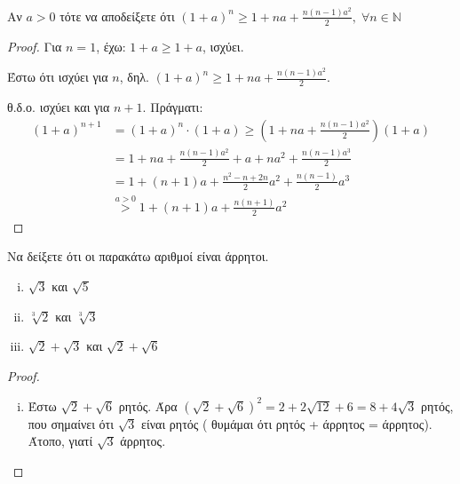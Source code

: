 \begin{multicols}{2}
\begin{enumerate}
    \item \textcolor{Col1}{Αν $a > 0$ τότε να αποδείξετε ότι $ (1+a)^{n} 
            \geq 1 + na + \frac{n(n-1)a^{2}}{2},\; \forall n \in \mathbb{N}$}

        \begin{proof}
        \item {}
            Για $ n=1 $, έχω: $ 1+a \geq 1+a $, ισχύει.

            Έστω ότι ισχύει για $n$, δηλ. $ (1+a)^{n} \geq 1+na +
            \frac{n(n-1)a^{2}}{2} $.

            θ.δ.ο. ισχύει και για $ n+1 $. Πράγματι:
\begin{align*}
    (1+a)^{n+1} &= (1+a)^{n}\cdot (1+a) \geq (1+na+ 
    \frac{n(n-1)a^{2}}{2})(1+a) \\
                &= 1+na+ \frac{n(n-1)a^{2}}{2} + a + na^{2} + 
                \frac{n(n-1)a^{3}}{2} \\
                &= 1+(n+1)a+ \frac{n^{2}-n+2n}{2} a^{2} + 
                \frac{n(n-1)}{2} a^{3} \\
                &\overset{a>0}{>} 1+(n+1)a + \frac{n(n+1)}{2} a^{2}
\end{align*}
        \end{proof}


    \item \textcolor{Col1}{Να δείξετε ότι οι παρακάτω αριθμοί είναι άρρητοι.
        \begin{enumerate}[i)]
            \item $ \sqrt{3} $ και  $ \sqrt{5} $
            \item $ \sqrt[3]{2} $ και $ \sqrt[3]{3} $
            \item $ \sqrt{2} + \sqrt{3} $ και $ \sqrt{2} + \sqrt{6} $ 
    \end{enumerate}}
    \end{enumerate}

    \begin{proof}
    \item {}
        \begin{enumerate}[i)]
            \item Έστω $ \sqrt{2} + \sqrt{6} $ ρητός. Άρα $ (\sqrt{2} +
                \sqrt{6} )^{2} = 2 + 2 \sqrt{12} + 6 = 8 + 4 \sqrt{3} $ 
                ρητός, που σημαίνει ότι $ \sqrt{3} $ είναι ρητός (
                θυμάμαι ότι ρητός + άρρητος = άρρητος). Άτοπο, 
                γιατί $ \sqrt{3} $ άρρητος.
        \end{enumerate}
    \end{proof}
    

\end{multicols}


